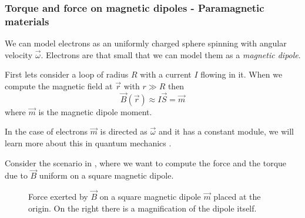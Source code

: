 \documentclass[12pt]{extarticle}
\begin{document}
\subsubsection{Torque and force on magnetic dipoles - Paramagnetic materials}

We can model electrons as an uniformly charged sphere spinning with angular velocity $\vec \omega$.
Electrons are that small that we can model them as a \emph{magnetic dipole}.

First lets consider a loop of radius $R$ with a current $I$ flowing in it.
When we compute the magnetic field at $\vec r$ with $r \gg R$ then
\begin{equation}
    \vec B(\vec r) \approx I \vec S = \vec m
\end{equation}
where $\vec m$ is the magnetic dipole moment.

In the case of electrons $\vec m$ is directed as $\vec \omega$ and it has a constant module,
we will learn more about this in quantum mechanics .

Consider the scenario in , where we want to compute the force and the torque due to $\vec B$ uniform on
a square magnetic dipole.
\begin{figure}[H]
    \centering
    
    \caption{Force exerted by $\vec B$ on a square magnetic dipole $\vec m$ placed at the origin.
        On the right there is a magnification of the dipole itself.}
    \label{fig:mag-dipole}
\end{figure}
\end{document}

